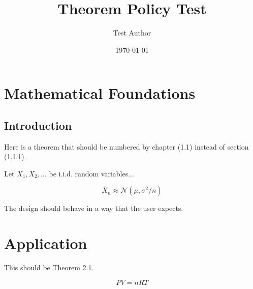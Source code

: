 \documentclass[chaptertheorems]{otbook}
\title{Theorem Policy Test}
\author{Test Author}
\date{\today}
\begin{document}
\makeotbooktitle

\chapter{Mathematical Foundations}

\section{Introduction}

Here is a theorem that should be numbered by chapter (1.1) instead of section (1.1.1).

\begin{otplainthm}
  \label{thm:clt}
  Let $X_1, X_2, \dots$ be i.i.d. random variables...
\end{otplainthm}

\begin{equation}
  \label{eq:clt}
  \bar{X}_n \approx \mathcal{N}(\mu, \sigma^2/n)
\end{equation}

\begin{designrule}
  \label{rule:astonishment}
  The design should behave in a way that the user expects.
\end{designrule}

\chapter{Application}

\begin{otplainthm}
  This should be Theorem 2.1.
\end{otplainthm}

\begin{equation}
  PV = nRT
\end{equation}
\end{document}
